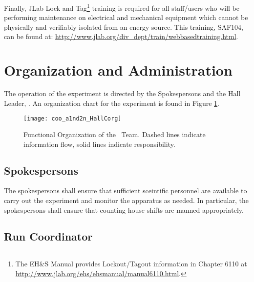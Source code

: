 \documentclass[10pt]{article}
\begin{document}
Finally, JLab Lock and Tag\footnote{The EH\&S Manual provides Lockout/Tagout
information in Chapter 6110 at \url{http://www.jlab.org/ehs/ehsmanual/manual6110.html}.}
training is required for all staff/users who will be
performing maintenance on electrical and mechanical equipment which
cannot be physically and verifiably isolated from an energy
source.   This training, SAF104, can be found at:   \newline
\url{http://www.jlab.org/div_dept/train/webbasedtraining.html}.



\section{ Organization  and Administration}

The operation of the experiment is directed by the Spokespersons and the Hall
Leader, \HALLLEADER. An organization chart for the experiment is
found in Figure \ref{HALLCHART}.

\begin{figure}
\texttt{[image: coo\_a1nd2n\_HallCorg]}
%
%
%
%
\caption[Dummy caption.]{Functional Organization of the \HALL\ Team. Dashed
lines indicate information flow, solid lines indicate responsibility.}
\label{HALLCHART}
\end{figure}

\subsection{Spokespersons}
The spokespersons shall ensure that sufficient sceintific
personnel are available to
carry out the experiment and monitor the apparatus as needed.
In particular, the spokespersons shall ensure that counting house
shifts are manned appropriately.

\subsection{Run Coordinator}
\end{document}
